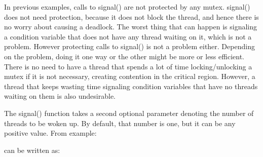
In previous examples, calls to \textsf{signal()} are not
protected by any mutex. \textsf{signal()} does not need
protection, because it does not block the thread, and hence there is no
worry about causing a deadlock. The worst thing that can happen is
signaling a condition variable that does not have any thread waiting on
it, which is not a problem. However protecting calls to
\textsf{signal()} is not a problem either. Depending on the
problem, doing it one way or the other might be more or less efficient.
There is no need to have a thread that spends a lot of time
locking/unlocking a mutex if it is not necessary, creating contention
in the critical region. However, a thread that keeps wasting time
signaling condition variables that have no threads waiting on them is
also undesirable.

The \textsf{signal()} function takes a second optional
parameter denoting the number of threads to be woken up. By default,
that number is one, but it can be any positive value. From example:


can be written as:

